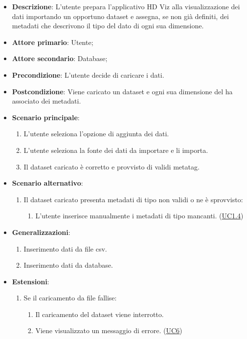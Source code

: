 \begin{itemize}
    \item \textbf{Descrizione}: L'utente prepara l'applicativo HD Viz alla visualizzazione dei dati importando un opportuno dataset e assegna, se non già definiti, dei metadati che descrivono il tipo del dato di ogni sua dimensione.
	
    \item \textbf{Attore primario}: Utente;
    \item \textbf{Attore secondario}: Database;
    
    
    \item \textbf{Precondizione}:   L'utente decide di caricare i dati.

    \item \textbf{Postcondizione}:  Viene caricato un dataset e ogni sua dimensione del ha associato
                                    dei metadati.

	\item \textbf{Scenario principale}:
		\begin{enumerate}
			\item L'utente seleziona l'opzione di aggiunta dei dati.
            \item L'utente seleziona la fonte dei dati da importare e li importa.
            \item Il dataset caricato è corretto e provvisto di validi metatag.
        \end{enumerate}
   
    \item \textbf{Scenario alternativo}:
		\begin{enumerate}
            \item Il dataset caricato presenta metadati di tipo non validi o ne è sprovvisto:
            \begin{enumerate}
                \item L'utente inserisce manualmente i metadati di tipo mancanti. (\hyperref[ssub:uc1.4]{UC1.4})
            \end{enumerate}
        \end{enumerate}

    \item \textbf{Generalizzazioni}:
    \begin{enumerate}
        \item Inserimento dati da file csv.
        \item Inserimento dati da database.
    \end{enumerate}
    
    \item \textbf{Estensioni}:
    \begin{enumerate}
        \item Se il caricamento da file fallise:
        \begin{enumerate}
            \item Il caricamento del dataset viene interrotto.
            \item Viene visualizzato un messaggio di errore. (\hyperref[sub:uc6]{UC6})
        \end{enumerate}
    \end{enumerate}
\end{itemize}

